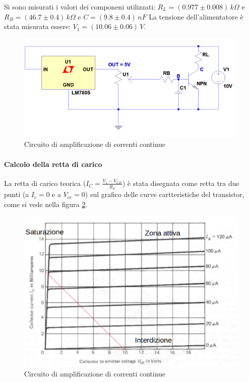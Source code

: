 \documentclass[10pt,a4paper]{article}
\begin{document}
Si sono misurati i valori dei componeni utilizzati: $R_L = (0.977 \pm 0.008) \, k\Omega$ e $R_B= (46.7 \pm 0.4) \, k\Omega $ e $C=(9.8 \pm 0.4) \, nF$
La tensione dell'alimentatore è stata misurata essere: $V_1 = (10.06 \pm 0.06) \, V$. 

\begin{figure}[!htb]
  \centering
  \includegraphics[scale=0.4]{circuito}
\caption{Circuito di amplificazione di correnti continue}
\label{circuito}
\end{figure}

\paragraph{Calcolo della retta di carico}
La retta di carico teorica ($I_C = \frac{V_1 - V_{CE}}{R_L}$) è stata disegnata come retta tra due punti (a $I_c = 0$ e a $V_{ce} = 0$) sul grafico delle curve cartteristiche del transistor, come si vede nella figura
 \ref{caricoTeorica}.
 
\begin{figure}[!htb]
  \centering
  \includegraphics[scale=0.4]{rettaCarico.png} 
\caption{Circuito di amplificazione di correnti continue} \label{caricoTeorica}
\end{figure}
 
\end{document}
